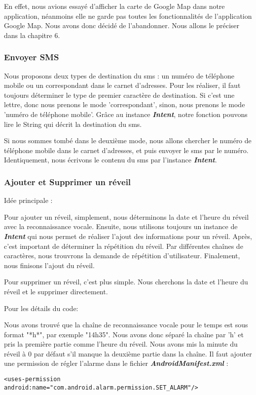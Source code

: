\indent En effet, nous avions essayé d'afficher la carte de Google Map dans notre application, néanmoins elle ne garde pas toutes les fonctionnalités de l'application Google Map. Nous avons donc décidé de l'abandonner. Nous allons le préciser dans la chapitre 6.

\subsubsection{Envoyer SMS}

\indent Nous proposons deux types de destination du sms : un numéro de téléphone mobile ou un correspondant dans le carnet d'adresses.  Pour les réaliser, il faut toujours déterminer le type de premier caractère de destination. Si c'est une lettre, donc nous prenons le mode 'correspondant', sinon, nous prenons le mode 'numéro de téléphone mobile'. Grâce au instance \textbf{\emph{Intent}}, notre fonction pouvons lire le String qui décrit la destination du sms. 

\indent Si nous sommes tombé dans le deuxième mode, nous allons chercher le numéro de téléphone mobile dans le carnet d'adresses, et puis envoyer le sms par le numéro.\\

\indent Identiquement, nous écrivons le contenu du sms par l'instance \textbf{\emph{Intent}}.
	
\subsubsection{Ajouter et Supprimer un réveil}

\indent Idée principale :

\indent Pour ajouter un réveil, simplement, nous déterminons la date et l'heure du réveil avec la reconnaissance vocale. Ensuite, nous utilisons toujours un instance de \textbf{\emph{Intent}} qui nous permet de réaliser l'ajout des informations pour un réveil. Après, c'est important de déterminer la répétition du réveil. Par différentes chaînes de caractères, nous trouvrons la demande de répétition d'utilisateur. Finalement, nous finisons l'ajout du réveil.

\indent Pour supprimer un réveil, c'est plus simple. Nous cherchons la date et l'heure du réveil et le supprimer directement.

\indent Pour les détails du code: 

\indent Nous avons trouvé que la chaîne de reconnaissance vocale pour le temps est sous format "*h*", par exemple "14h35". Nous avons donc séparé la chaîne par 'h' et pris la première partie comme l'heure du réveil. Nous avons mis la minute du réveil à 0 par défaut s'il manque la deuxième partie dans la chaîne. Il faut ajouter une permission de régler l'alarme dans le fichier \textbf{\emph{AndroidManifest.xml}} : \\
	\begin{lstlisting}[frame=none,aboveskip=-0.5em,basicstyle=\footnotesize\bfseries]
	<uses-permission android:name="com.android.alarm.permission.SET_ALARM"/>
	\end{lstlisting}


